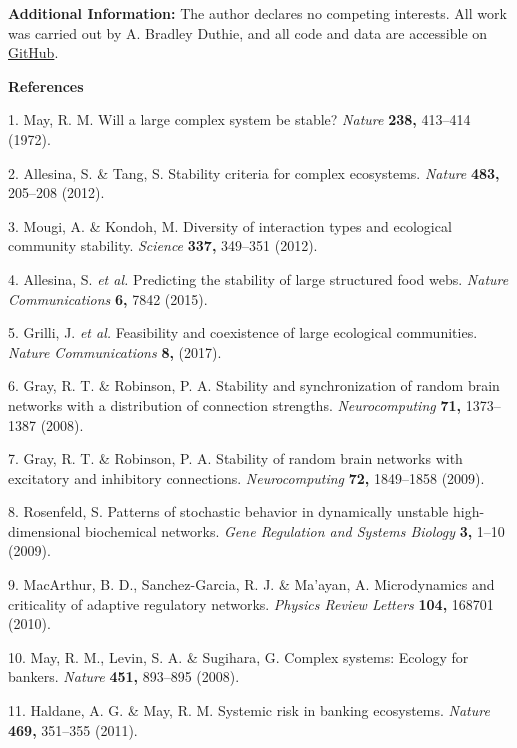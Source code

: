 \documentclass[]{article}
\begin{document}
\textbf{Additional Information:} The author declares no competing
interests. All work was carried out by A. Bradley Duthie, and all code
and data are accessible on
\href{https://github.com/bradduthie/RandomMatrixStability}{GitHub}.

\textbf{References}

\hypertarget{refs}{}
\hypertarget{ref-May1972}{}
1. May, R. M. Will a large complex system be stable? \emph{Nature}
\textbf{238,} 413--414 (1972).

\hypertarget{ref-Allesina2012}{}
2. Allesina, S. \& Tang, S. Stability criteria for complex ecosystems.
\emph{Nature} \textbf{483,} 205--208 (2012).

\hypertarget{ref-Mougi2012}{}
3. Mougi, A. \& Kondoh, M. Diversity of interaction types and ecological
community stability. \emph{Science} \textbf{337,} 349--351 (2012).

\hypertarget{ref-Allesina2015}{}
4. Allesina, S. \emph{et al.} Predicting the stability of large
structured food webs. \emph{Nature Communications} \textbf{6,} 7842
(2015).

\hypertarget{ref-Grilli2017}{}
5. Grilli, J. \emph{et al.} Feasibility and coexistence of large
ecological communities. \emph{Nature Communications} \textbf{8,} (2017).

\hypertarget{ref-Gray2008}{}
6. Gray, R. T. \& Robinson, P. A. Stability and synchronization of
random brain networks with a distribution of connection strengths.
\emph{Neurocomputing} \textbf{71,} 1373--1387 (2008).

\hypertarget{ref-Gray2009}{}
7. Gray, R. T. \& Robinson, P. A. Stability of random brain networks
with excitatory and inhibitory connections. \emph{Neurocomputing}
\textbf{72,} 1849--1858 (2009).

\hypertarget{ref-Rosenfeld2009}{}
8. Rosenfeld, S. Patterns of stochastic behavior in dynamically unstable
high-dimensional biochemical networks. \emph{Gene Regulation and Systems
Biology} \textbf{3,} 1--10 (2009).

\hypertarget{ref-MacArthur2010}{}
9. MacArthur, B. D., Sanchez-Garcia, R. J. \& Ma'ayan, A. Microdynamics
and criticality of adaptive regulatory networks. \emph{Physics Review
Letters} \textbf{104,} 168701 (2010).

\hypertarget{ref-May2008}{}
10. May, R. M., Levin, S. A. \& Sugihara, G. Complex systems: Ecology
for bankers. \emph{Nature} \textbf{451,} 893--895 (2008).

\hypertarget{ref-Haldane2011}{}
11. Haldane, A. G. \& May, R. M. Systemic risk in banking ecosystems.
\emph{Nature} \textbf{469,} 351--355 (2011).
\end{document}
